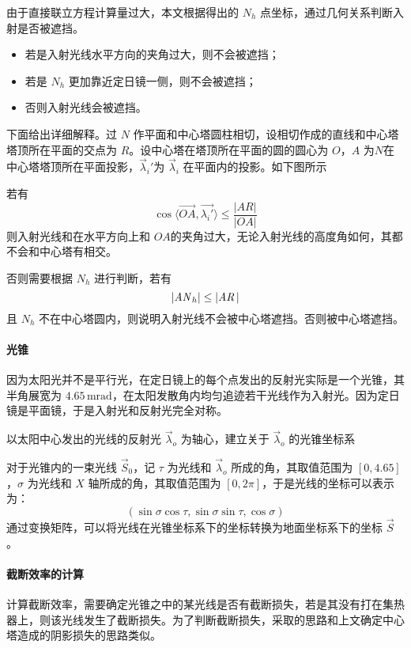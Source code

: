 \documentclass[../main.tex]{subfiles}
\begin{document}
由于直接联立方程计算量过大，本文根据得出的 \(N_{h}\) 点坐标，通过几何关系判断入射是否被遮挡。
\begin{itemize}
\item 若是入射光线水平方向的夹角过大，则不会被遮挡；
\item 若是 \(N_{h}\) 更加靠近定日镜一侧，则不会被遮挡；
\item 否则入射光线会被遮挡。
\end{itemize}
下面给出详细解释。过 \(N\) 作平面和中心塔圆柱相切，设相切作成的直线和中心塔塔顶所在平面的交点为 \(R\)。设中心塔在塔顶所在平面的圆的圆心为 \(O\)，\(A\) 为\(N\)在中心塔塔顶所在平面投影，\(\vec \lambda _{i} '\)为 \(\vec \lambda _{i}\) 在平面内的投影。如下图所示

若有
\begin{equation}
\cos \langle \overrightarrow {OA}, \vec {\lambda _{i} '} \rangle \le \frac{\vert AR \vert }{\vert OA \vert }
\end{equation}
则入射光线和在水平方向上和 \(OA\)的夹角过大，无论入射光线的高度角如何，其都不会和中心塔有相交。

否则需要根据 \(N_{h}\) 进行判断，若有
\begin{equation}
\vert {\it A N}_{h}\vert \le \vert {\it AR\,} \vert
\end{equation}
且 \( N_{h}\) 不在中心塔圆内，则说明入射光线不会被中心塔遮挡。否则被中心塔遮挡。
\paragraph{光锥}
因为太阳光并不是平行光，在定日镜上的每个点发出的反射光实际是一个光锥，其半角展宽为 \(4.65 \, \mathrm{m}\mathrm{rad}\)，在太阳发散角内均匀追迹若干光线作为入射光。因为定日镜是平面镜，于是入射光和反射光完全对称。

以太阳中心发出的光线的反射光 \(\vec\lambda _{o} \) 为轴心，建立关于 \(\vec \lambda _{o}\) 的光锥坐标系

对于光锥内的一束光线 \(\vec S _{0}\)，记 \(\tau\) 为光线和 \(\vec\lambda _{o}\) 所成的角，其取值范围为 \([0, 4.65]\)，\(\sigma\) 为光线和 \(X\) 轴所成的角，其取值范围为 \([0 , 2\pi ]\)，于是光线的坐标可以表示为：
\[
(\sin \sigma \cos \tau, \sin \sigma \sin \tau, \cos \sigma)
\]
通过变换矩阵，可以将光线在光锥坐标系下的坐标转换为地面坐标系下的坐标 \(\vec S\)。
\paragraph{截断效率的计算}
计算截断效率，需要确定光锥之中的某光线是否有截断损失，若是其没有打在集热器上，则该光线发生了截断损失。为了判断截断损失，采取的思路和上文确定中心塔造成的阴影损失的思路类似。
\end{document}
